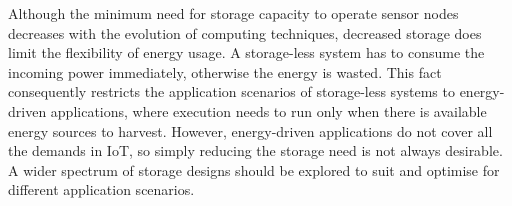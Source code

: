Although the minimum need for storage capacity to operate sensor nodes decreases with the evolution of computing techniques, decreased storage does limit the flexibility of energy usage. 
A storage-less system has to consume the incoming power immediately, otherwise the energy is wasted. 
This fact consequently restricts the application scenarios of storage-less systems to energy-driven applications, where execution needs to run only when there is available energy sources to harvest. 
However, energy-driven applications do not cover all the demands in IoT, so simply reducing the storage need is not always desirable. 
A wider spectrum of storage designs should be explored to suit and optimise for different application scenarios.

